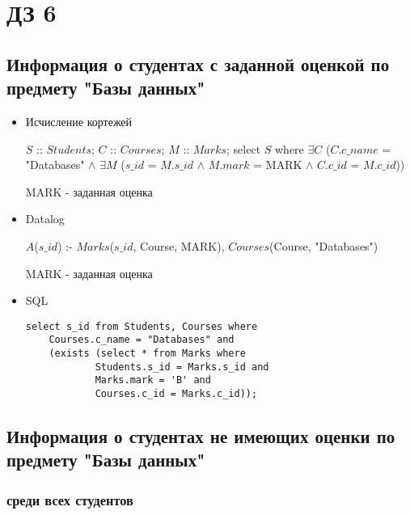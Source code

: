 \documentclass[12pt,a4paper,oneside]{article}
\begin{document}
\section{ДЗ 6}

\subsection{Информация о студентах с заданной оценкой по предмету "Базы данных"}

\bigskip

\begin{itemize}

\item Исчисление кортежей

$S$ :: $Students$; $C$ :: $Courses$; $M$ :: $Marks$; select $S$ where $\exists C$ ($C.c\_name$ = "Databases" $\wedge$ $\exists M$ ($s\_id$ = $M.s\_id$ $\wedge$ $M.mark$ = MARK $\wedge$ $C.c\_id$ = $M.c\_id$))

MARK - заданная оценка

\item Datalog

$A$($s\_id$) :- $Marks$($s\_id$, Course, MARK), $Courses$(Course, "Databases")

MARK - заданная оценка

\item SQL

\begin{lstlisting}[label=task1,caption={Задание 1}]
select s_id from Students, Courses where
    Courses.c_name = "Databases" and
    (exists (select * from Marks where
            Students.s_id = Marks.s_id and
            Marks.mark = 'B' and
            Courses.c_id = Marks.c_id));
\end{lstlisting}

\end{itemize}

\subsection{Информация о студентах не имеющих оценки по предмету "Базы данных"}

\subsubsection{среди всех студентов}
\end{document}
